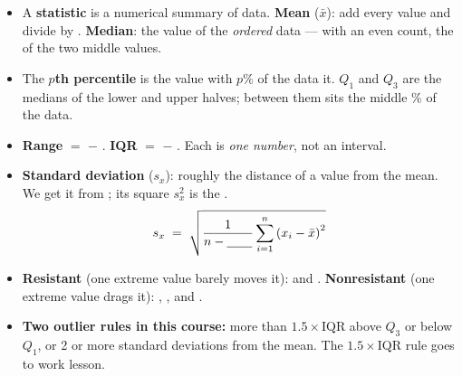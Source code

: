 \documentclass[12pt]{article}
\begin{document}
\boxguard[14]
\begin{tcolorbox}[enhanced, colback=sky, colframe=navy, boxrule=0.8pt, arc=2mm,
    left=3mm, right=3mm, top=1.5mm, bottom=1.5mm, breakable,
    fonttitle=\bfseries\small\color{white}, title={QuickNotes: Summarizing a Quantitative Variable},
    attach boxed title to top left={yshift=-2mm, xshift=4mm},
    boxed title style={colback=navy, colframe=navy, arc=1.5mm}]
\small
\setlength{\abovedisplayskip}{3pt}\setlength{\belowdisplayskip}{3pt}
\setlength{\abovedisplayshortskip}{3pt}\setlength{\belowdisplayshortskip}{3pt}
\begin{itemize}[leftmargin=1.1em, itemsep=3pt]
  \item A \textbf{statistic} is a numerical summary of \blank{2.4cm} data.
        \textbf{Mean} ($\bar x$): add every value and divide by \blank{4.4cm}.
        \textbf{Median}: the \blank{1.7cm} value of the \emph{ordered} data --- with an even
        count, the \blank{2.0cm} of the two middle values.
  \item The \textbf{$p$th percentile} is the value with $p\%$ of the data \blank{4.6cm} it.
        \textbf{$Q_1$} and \textbf{$Q_3$} are the medians of the lower and upper halves;
        between them sits the middle \blank{1.2cm}\% of the data.
  \item \textbf{Range} $=$ \blank{2.2cm} $-$ \blank{2.2cm}. \quad
        \textbf{IQR} $=$ \blank{1.3cm} $-$ \blank{1.3cm}. \quad Each is \emph{one number}, not
        an interval.
  \item \textbf{Standard deviation} ($s_x$): roughly the \blank{2.2cm} distance of a value from
        the mean. We get it from \blank{2.4cm}; its square $s_x^2$ is the \blank{2.2cm}.
        \[ s_x \;=\; \sqrt{\frac{1}{n-\blank{0.7cm}}\sum_{i=1}^{n}\left(x_i-\bar x\right)^2} \]
  \item \textbf{Resistant} (one extreme value barely moves it): \blank{2.0cm} and
        \blank{1.4cm}. \quad \textbf{Nonresistant} (one extreme value drags it):
        \blank{1.6cm}, \blank{4.0cm}, and \blank{1.6cm}.
  \item \textbf{Two outlier rules in this course:} more than $1.5\times\text{IQR}$ above $Q_3$
        or below $Q_1$, or 2 or more standard deviations from the mean. The
        $1.5\times\text{IQR}$ rule goes to work \blank{2.0cm} lesson.
\end{itemize}
\end{tcolorbox}
\end{document}
